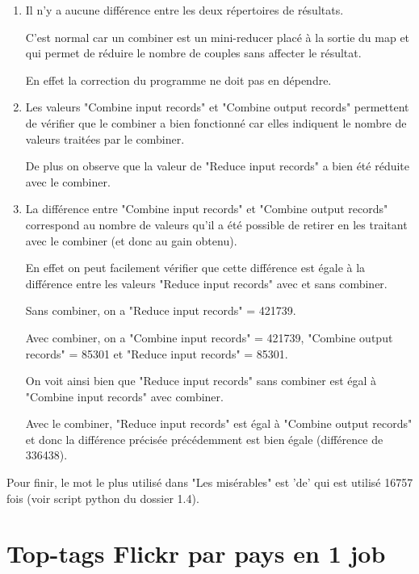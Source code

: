 \documentclass[a4paper, 11pt, titlepage]{article}
\begin{document}
\begin{enumerate}

\item

Il n'y a aucune différence entre les deux répertoires de résultats.

C'est normal car un combiner est un mini-reducer placé à la sortie du map et qui permet de réduire le nombre de couples sans affecter le résultat.

En effet la correction du programme ne doit pas en dépendre.

\item
Les valeurs "Combine input records" et "Combine output records" permettent de vérifier que le combiner a bien fonctionné car elles indiquent le nombre de valeurs traitées par le combiner.

De plus on observe que la valeur de "Reduce input records" a bien été réduite avec le combiner.

\item
La différence entre "Combine input records" et "Combine output records" correspond au nombre de valeurs qu'il a été possible de retirer en les traitant avec le combiner (et donc au gain obtenu).

En effet on peut facilement vérifier que cette différence est égale à la différence entre les valeurs "Reduce input records" avec et sans combiner.

Sans combiner, on a "Reduce input records" = 421739.

Avec combiner, on a "Combine input records" = 421739, "Combine output records" = 85301 et "Reduce input records" = 85301.

On voit ainsi bien que "Reduce input records" sans combiner est égal à "Combine input records" avec combiner.

Avec le combiner, "Reduce input records" est égal à "Combine output records" et donc la différence précisée précédemment est bien égale (différence de 336438).

\end{enumerate}


Pour finir, le mot le plus utilisé dans "Les misérables" est 'de' qui est utilisé 16757 fois (voir script python du dossier 1.4).



\section {Top-tags Flickr par pays en 1 job}
\end{document}
